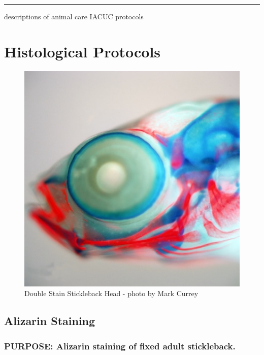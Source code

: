 \documentclass[
]{book}
\begin{document}
\begin{center}\rule{0.5\linewidth}{0.5pt}\end{center}

descriptions of animal care IACUC protocols

\hypertarget{histological-protocols}{%
\chapter{Histological Protocols}\label{histological-protocols}}

\begin{figure}
\centering
\includegraphics{images/double_head.jpg}
\caption{Double Stain Stickleback Head - photo by Mark Currey}
\end{figure}

\hypertarget{alizarin-staining}{%
\section{Alizarin Staining}\label{alizarin-staining}}

\hypertarget{purpose-alizarin-staining-of-fixed-adult-stickleback.}{%
\subsection{PURPOSE: Alizarin staining of fixed adult stickleback.}\label{purpose-alizarin-staining-of-fixed-adult-stickleback.}}
\end{document}
